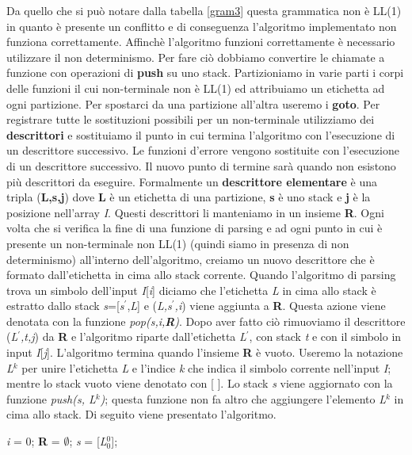 Da quello che si può notare dalla tabella \ref{gram3} questa grammatica non è LL(1) in quanto è presente un conflitto e di conseguenza l'algoritmo implementato non funziona correttamente. Affinchè l'algoritmo funzioni correttamente è necessario utilizzare il non determinismo. Per fare ciò dobbiamo convertire le chiamate a funzione con operazioni di \textbf{push} su uno stack. Partizioniamo in varie parti i corpi delle funzioni il cui non-terminale non è LL(1) ed attribuiamo un etichetta ad ogni partizione. Per spostarci da una partizione all'altra useremo i \textbf{goto}. Per registrare tutte le sostituzioni possibili per un non-terminale utilizziamo dei \textbf{descrittori} e sostituiamo il punto in cui termina l'algoritmo con l'esecuzione di un descrittore successivo. Le funzioni d'errore vengono sostituite con l'esecuzione di un descrittore successivo. Il nuovo punto di termine sarà quando non esistono più descrittori da eseguire. Formalmente un \textbf{descrittore elementare} è una tripla (\textbf{L,s,j}) dove \textbf{L} è un etichetta di una partizione, \textbf{s} è uno stack e \textbf{j} è la posizione nell'array \textit{I}. Questi descrittori li manteniamo in un insieme \textbf{R}. Ogni volta che si verifica la fine di una funzione di parsing e ad ogni punto in cui è presente un non-terminale non LL(1) (quindi siamo in presenza di non determinismo) all'interno dell'algoritmo, creiamo un nuovo descrittore che è formato dall'etichetta in cima allo stack corrente. Quando l'algoritmo di parsing trova un simbolo dell'input \textit{I}[\textit{i}] diciamo che l'etichetta \textit{L} in cima allo stack è estratto dallo stack \textit{s}=[\textit{s$^{'}$},\textit{L}] e (\textit{L,s$^{'}$,i}) viene aggiunta a \textbf{R}. Questa azione viene denotata con la funzione \textit{pop(s,i,\textbf{R})}. Dopo aver fatto ciò rimuoviamo il descrittore (\textit{L$^{'}$,t,j}) da \textbf{R} e l'algoritmo riparte dall'etichetta \textit{L$^{'}$}, con stack \textit{t} e con il simbolo in input \textit{I}[\textit{j}]. L'algoritmo termina quando l'insieme \textbf{R} è vuoto. Useremo la notazione \textit{L}$^{k}$ per unire l'etichetta \textit{L} e l'indice \textit{k} che indica il simbolo corrente nell'input \textit{I}; mentre lo stack vuoto viene denotato con [ ]. Lo stack \textit{s} viene aggiornato con la funzione \textit{push(s, L$^{k}$)}; questa funzione non fa altro che aggiungere  l'elemento \textit{L}$^{k}$ in cima allo stack. Di seguito viene presentato l'algoritmo.\par
\vspace{0.5cm}
\hspace{0.2cm}\textit{i} = 0; \textbf{R} = $\emptyset$; \textit{s} = [\textit{L$_0^{0}$}];\\
